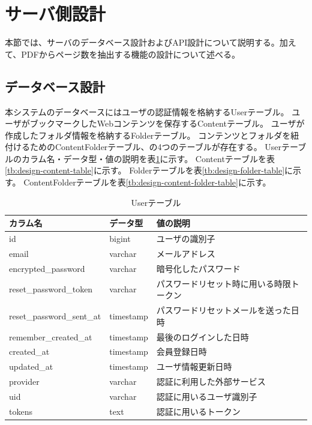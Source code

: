 \section{サーバ側設計}
本節では、サーバのデータベース設計およびAPI設計について説明する。加えて、PDFからページ数を抽出する機能の設計について述べる。

\subsection{データベース設計}
本システムのデータベースにはユーザの認証情報を格納するUserテーブル。
ユーザがブックマークしたWebコンテンツを保存するContentテーブル。
ユーザが作成したフォルダ情報を格納するFolderテーブル。
コンテンツとフォルダを紐付けるためのContentFolderテーブル、の4つのテーブルが存在する。
Userテーブルのカラム名・データ型・値の説明を表\ref{tb:design-user-table}に示す。
Contentテーブルを表\ref{tb:design-content-table}に示す。
Folderテーブルを表\ref{tb:design-folder-table}に示す。
ContentFolderテーブルを表\ref{tb:design-content-folder-table}に示す。

\begin{table}[htbp]
  \label{tb:design-user-table}
  \caption{Userテーブル}
  \begin{center}
    \begin{tabular}{|l|l|l|}
      \hline
      カラム名 & データ型 & 値の説明 \\\hline\hline
      id & bigint & ユーザの識別子 \\\hline
      email & varchar & メールアドレス \\\hline
      encrypted\_password & varchar & 暗号化したパスワード \\\hline
      reset\_password\_token & varchar & パスワードリセット時に用いる時限トークン \\\hline
      reset\_password\_sent\_at & timestamp & パスワードリセットメールを送った日時 \\\hline
      remember\_created\_at & timestamp & 最後のログインした日時 \\\hline
      created\_at & timestamp & 会員登録日時 \\\hline
      updated\_at & timestamp & ユーザ情報更新日時 \\\hline
      provider & varchar & 認証に利用した外部サービス \\\hline
      uid & varchar & 認証に用いるユーザ識別子 \\\hline
      tokens & text & 認証に用いるトークン \\\hline
    \end{tabular}
  \end{center}
\end{table}

